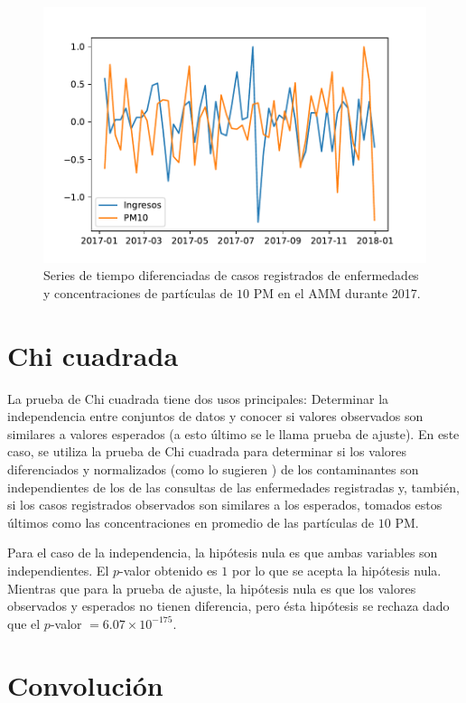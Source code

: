\documentclass[paper=leter, fontsize=11pt]{scrartcl}
\begin{document}
\begin{figure}
    \centering
    \includegraphics{2017_ingresos_PM10_diff_semana.pdf}
  \caption{Series de tiempo diferenciadas de casos registrados de enfermedades y concentraciones de partículas de $10$ PM en el AMM durante 2017.}
  \label{diff}
\end{figure}

\section{Chi cuadrada}

La prueba de Chi cuadrada tiene dos usos principales: Determinar la independencia entre conjuntos de datos y conocer si valores observados son similares a valores esperados (a esto último se le llama prueba de ajuste). En este caso, se utiliza la prueba de Chi cuadrada para determinar si los valores diferenciados y normalizados (como lo sugieren \citet{diff}) de los contaminantes son independientes de los de las consultas de las enfermedades registradas y, también, si los casos registrados observados son similares a los esperados, tomados estos últimos como las concentraciones en promedio de las partículas de $10$ PM. 

Para el caso de la independencia, la hipótesis nula es que ambas variables son independientes. El $p$-valor obtenido es $1$ por lo que se acepta la hipótesis nula. Mientras que para la prueba de ajuste, la hipótesis nula es que los valores observados y esperados no tienen diferencia, pero ésta hipótesis se rechaza dado que el $p$-valor $= 6.07 \times 10 ^{-175}$.

\section{Convolución}
\end{document}
